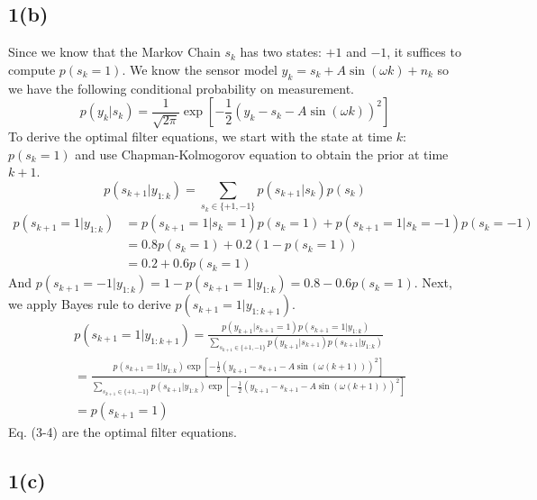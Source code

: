 \documentclass[a4paper, 11pt]{article}
\begin{document}
\subsection*{1(b)}
Since we know that the Markov Chain $s_k$ has two states: $+1$ and $-1$, it suffices to compute $p(s_k=1)$. We know the sensor model $y_k = s_k + A\sin(\omega k) + n_k$ so we have the following conditional probability on measurement. 
\begin{equation}
p(y_k|s_k) = \frac{1}{\sqrt{2\pi}}\exp\left[-\frac{1}{2}\left(y_k - s_k - A\sin(\omega k) \right)^2 \right]
\end{equation}
To derive the optimal filter equations, we start with the state at time $k$: $p(s_k=1)$ and use Chapman-Kolmogorov equation to obtain the prior at time $k+1$. 
\begin{equation}
p(s_{k+1}|y_{1:k}) = \sum_{s_k\in \{+1, -1\}} p(s_{k+1}|s_k)p(s_k)
\end{equation}
\begin{equation}
\begin{split}
p(s_{k+1}=1|y_{1:k}) & = p(s_{k+1}=1|s_k=1)p(s_k=1) + p(s_{k+1}=1|s_k=-1)p(s_k=-1) \\
 & = 0.8 p(s_k=1) + 0.2(1 - p(s_k=1)) \\ 
 & = 0.2 + 0.6 p(s_k=1)
\end{split}
\end{equation}
And $p(s_{k+1}=-1|y_{1:k}) = 1- p(s_{k+1}=1|y_{1:k}) = 0.8 - 0.6 p(s_k=1)$. Next, we apply Bayes rule to derive $p(s_{k+1}=1|y_{1:k+1})$. 
\begin{equation}
\begin{split}
 & p(s_{k+1}=1|y_{1:k+1}) = \frac{p(y_{k+1}|s_{k+1}=1)p(s_{k+1}=1|y_{1:k})}{\sum_{s_{k+1}\in \{+1, -1\}}p(y_{k+1}|s_{k+1})p(s_{k+1}|y_{1:k})}\\
 & = \frac{p(s_{k+1}=1|y_{1:k})\exp\left[-\frac{1}{2}\left(y_{k+1} - s_{k+1} - A\sin(\omega (k+1)) \right)^2 \right]}{\sum_{s_{k+1}\in \{+1, -1\}}p(s_{k+1}|y_{1:k})\exp\left[-\frac{1}{2}\left(y_{k+1} - s_{k+1} - A\sin(\omega (k+1)) \right)^2 \right]} \\ 
 & = p(s_{k+1}=1)
\end{split}
\end{equation}
Eq. (3-4) are the optimal filter equations. 



\subsection*{1(c)}
\end{document}
